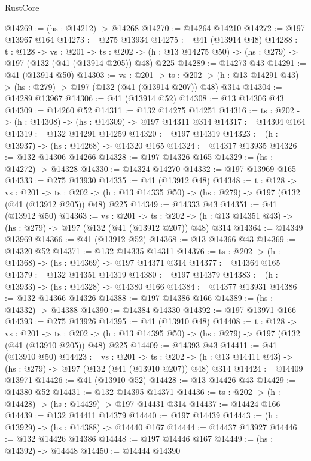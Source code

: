 \begin{lexlean}{RustCore}
\begin{coremodule}
@14269 := (hs : @14212) -> @14268
@14270 := @14264 @14210
@14272 := @197 @13967 @164
@14273 := @275 @13934
@14275 := @41 (@13914 @48)
@14288 := {t : @128} ->
  {vs : @201} ->
  {ts : @202} -> (h : @13 @14275 @50) -> (hs : @279) -> @197 (@132 (@41 (@13914 @205)) @48) @225
@14289 := @14273 @43
@14291 := @41 (@13914 @50)
@14303 := {vs : @201} ->
  {ts : @202} -> (h : @13 @14291 @43) -> (hs : @279) -> @197 (@132 (@41 (@13914 @207)) @48) @314
@14304 := @14289 @13967
@14306 := @41 (@13914 @52)
@14308 := @13 @14306 @43
@14309 := @14260 @52
@14311 := @132 @14275 @14251
@14316 := {ts : @202} -> (h : @14308) -> (hs : @14309) -> @197 @14311 @314
@14317 := @14304 @164
@14319 := @132 @14291 @14259
@14320 := @197 @14319
@14323 := (h : @13937) -> (hs : @14268) -> @14320 @165
@14324 := @14317 @13935
@14326 := @132 @14306 @14266
@14328 := @197 @14326 @165
@14329 := (hs : @14272) -> @14328
@14330 := @14324 @14270
@14332 := @197 @13969 @165
@14333 := @275 @13930
@14335 := @41 (@13912 @48)
@14348 := {t : @128} ->
  {vs : @201} ->
  {ts : @202} -> (h : @13 @14335 @50) -> (hs : @279) -> @197 (@132 (@41 (@13912 @205)) @48) @225
@14349 := @14333 @43
@14351 := @41 (@13912 @50)
@14363 := {vs : @201} ->
  {ts : @202} -> (h : @13 @14351 @43) -> (hs : @279) -> @197 (@132 (@41 (@13912 @207)) @48) @314
@14364 := @14349 @13969
@14366 := @41 (@13912 @52)
@14368 := @13 @14366 @43
@14369 := @14320 @52
@14371 := @132 @14335 @14311
@14376 := {ts : @202} -> (h : @14368) -> (hs : @14369) -> @197 @14371 @314
@14377 := @14364 @165
@14379 := @132 @14351 @14319
@14380 := @197 @14379
@14383 := (h : @13933) -> (hs : @14328) -> @14380 @166
@14384 := @14377 @13931
@14386 := @132 @14366 @14326
@14388 := @197 @14386 @166
@14389 := (hs : @14332) -> @14388
@14390 := @14384 @14330
@14392 := @197 @13971 @166
@14393 := @275 @13926
@14395 := @41 (@13910 @48)
@14408 := {t : @128} ->
  {vs : @201} ->
  {ts : @202} -> (h : @13 @14395 @50) -> (hs : @279) -> @197 (@132 (@41 (@13910 @205)) @48) @225
@14409 := @14393 @43
@14411 := @41 (@13910 @50)
@14423 := {vs : @201} ->
  {ts : @202} -> (h : @13 @14411 @43) -> (hs : @279) -> @197 (@132 (@41 (@13910 @207)) @48) @314
@14424 := @14409 @13971
@14426 := @41 (@13910 @52)
@14428 := @13 @14426 @43
@14429 := @14380 @52
@14431 := @132 @14395 @14371
@14436 := {ts : @202} -> (h : @14428) -> (hs : @14429) -> @197 @14431 @314
@14437 := @14424 @166
@14439 := @132 @14411 @14379
@14440 := @197 @14439
@14443 := (h : @13929) -> (hs : @14388) -> @14440 @167
@14444 := @14437 @13927
@14446 := @132 @14426 @14386
@14448 := @197 @14446 @167
@14449 := (hs : @14392) -> @14448
@14450 := @14444 @14390

\end{coremodule}
\end{lexlean}
